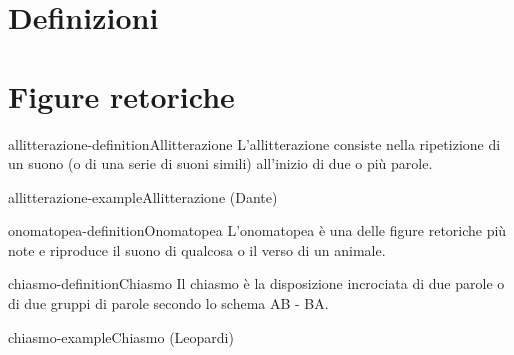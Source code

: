 \documentclass[preview]{standalone}
\begin{document}
\genpage

\section{Definizioni}


\section{Figure retoriche}

\begin{snippetdefinition}{allitterazione-definition}{Allitterazione}
    L'allitterazione consiste nella ripetizione di un suono
    (o di una serie di suoni simili) all'inizio di due o più parole.
\end{snippetdefinition}

\begin{snippetexample}{allitterazione-example}{Allitterazione}
     (Dante)
\end{snippetexample}

\begin{snippetdefinition}{onomatopea-definition}{Onomatopea}
    L'onomatopea è una delle figure retoriche più note e riproduce il suono di qualcosa o il verso di un animale.
\end{snippetdefinition}

\begin{snippetdefinition}{chiasmo-definition}{Chiasmo}
    Il chiasmo è la disposizione incrociata di due parole o di due gruppi di parole secondo lo schema AB - BA.
\end{snippetdefinition}

\begin{snippetexample}{chiasmo-example}{Chiasmo}
     (Leopardi)
\end{snippetexample}



\end{document}
